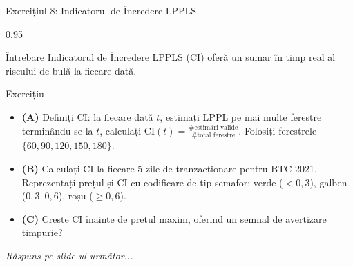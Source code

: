\documentclass[9pt, aspectratio=169, t]{beamer}
\begin{document}
\begin{frame}{Exercițiul 8: Indicatorul de Încredere LPPLS}
    \begin{cminipage}{0.95\textwidth}
    \begin{alertblock}{Întrebare}
        Indicatorul de Încredere LPPLS (CI) oferă un sumar în timp real al riscului de bulă la fiecare dată.
    \end{alertblock}

    \vspace{0.15cm}

    \begin{block}{Exercițiu}
        \begin{itemize}\setlength{\itemsep}{3pt}
            \item \textcolor{MainBlue}{\textbf{(A)}} Definiți CI: la fiecare dată $t$, estimați LPPL pe mai multe ferestre terminându-se la $t$, calculați CI$(t) = \frac{\text{\# estimări valide}}{\text{\# total ferestre}}$. Folosiți ferestrele $\{60, 90, 120, 150, 180\}$.
            \item \textcolor{MainBlue}{\textbf{(B)}} Calculați CI la fiecare 5 zile de tranzacționare pentru BTC 2021. Reprezentați prețul și CI cu codificare de tip semafor: verde ($< 0{,}3$), galben ($0{,}3$--$0{,}6$), roșu ($\geq 0{,}6$).
            \item \textcolor{MainBlue}{\textbf{(C)}} Crește CI înainte de prețul maxim, oferind un semnal de avertizare timpurie?
        \end{itemize}
    \end{block}

    \vspace{0.15cm}

    \begin{center}
        \textit{Răspuns pe slide-ul următor...}
    \end{center}
    \end{cminipage}
\end{frame}
\end{document}
